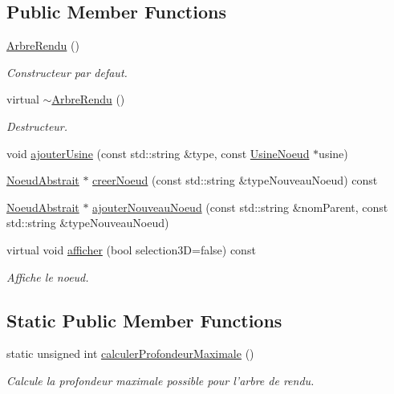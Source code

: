 \subsection*{Public Member Functions}
\begin{DoxyCompactItemize}
\item 
\hyperlink{group__inf2990_gaef1e98a66c4f1d3b468c786edee45ae6}{Arbre\-Rendu} ()
\begin{DoxyCompactList}\small\item\em Constructeur par defaut. \end{DoxyCompactList}\item 
virtual \hyperlink{group__inf2990_gadb462923759da0ff632dad097b7bfdab}{$\sim$\-Arbre\-Rendu} ()
\begin{DoxyCompactList}\small\item\em Destructeur. \end{DoxyCompactList}\item 
void \hyperlink{group__inf2990_gaef33737fda55a3916e895e1adc3e88ae}{ajouter\-Usine} (const std\-::string \&type, const \hyperlink{class_usine_noeud}{Usine\-Noeud} $\ast$usine)
\item 
\hyperlink{class_noeud_abstrait}{Noeud\-Abstrait} $\ast$ \hyperlink{group__inf2990_ga33ae9013f9cec73854d32527b85b41f9}{creer\-Noeud} (const std\-::string \&type\-Nouveau\-Noeud) const 
\item 
\hyperlink{class_noeud_abstrait}{Noeud\-Abstrait} $\ast$ \hyperlink{group__inf2990_gac10e5f0623af502d67f72aef764206a3}{ajouter\-Nouveau\-Noeud} (const std\-::string \&nom\-Parent, const std\-::string \&type\-Nouveau\-Noeud)
\item 
virtual void \hyperlink{group__inf2990_gab76c5b5c632e814ac27f784ff6d57809}{afficher} (bool selection3\-D=false) const 
\begin{DoxyCompactList}\small\item\em Affiche le noeud. \end{DoxyCompactList}\end{DoxyCompactItemize}
\subsection*{Static Public Member Functions}
\begin{DoxyCompactItemize}
\item 
static unsigned int \hyperlink{group__inf2990_gacf0e53d52040b07cd6550fda79867bd5}{calculer\-Profondeur\-Maximale} ()
\begin{DoxyCompactList}\small\item\em Calcule la profondeur maximale possible pour l'arbre de rendu. \end{DoxyCompactList}\end{DoxyCompactItemize}
